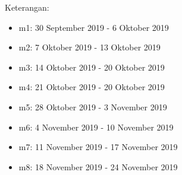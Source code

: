 Keterangan:
\begin{itemize}
    \item m1: 30 September 2019 - 6 Oktober 2019
    \item m2: 7 Oktober 2019 - 13 Oktober 2019
    \item m3: 14 Oktober 2019 - 20 Oktober 2019
    \item m4: 21 Oktober 2019 - 20 Oktober 2019
    \item m5: 28 Oktober 2019 - 3 November 2019
    \item m6: 4 November 2019 - 10 November 2019
    \item m7: 11 November 2019 - 17 November 2019
    \item m8: 18 November 2019 - 24 November 2019
\end{itemize}
